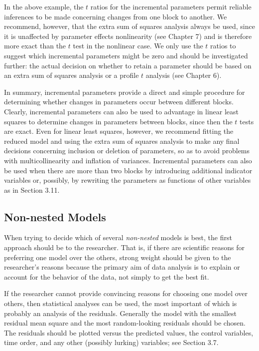 In the above example, the $t$ ratios for the
incremental parameters permit reliable
inferences to be made concerning changes from one block to
another.
We recommend, however, that the extra sum of squares analysis
always be used,
since it is unaffected by parameter effects
nonlinearity (see Chapter 7) and is therefore more exact than the $t$ test
in the nonlinear case.
We only use the $t$ ratios to suggest which incremental
parameters might be zero and should be investigated
further:
the actual decision on whether to retain a parameter should be based on an
extra sum of squares analysis or a profile $t$ analysis (see Chapter 6).

In summary, incremental parameters provide a direct and simple
procedure for determining whether changes in parameters occur
between different blocks.
Clearly, incremental parameters can also be used
to advantage in linear least squares to
determine changes in parameters between blocks, since then the
$t$ tests are exact.
Even for linear least squares, however, we recommend fitting the
reduced model and using the extra sum of squares analysis to
make any final decisions concerning inclusion or deletion of
parameters, so as to avoid problems with multicollinearity and inflation
of variances.
Incremental parameters can also be used when there are more than
two blocks by introducing additional indicator variables or,
possibly, by rewriting the parameters as functions of other
variables as in Section 3.11.

\subsection{Non-nested Models}

When trying to decide which of several {\em non-nested\/} models is
best, the first approach should be to the researcher.
That is, if there are scientific reasons for preferring one model
over the others, strong weight should be given to the
researcher's reasons because the primary aim of data analysis is
to explain or account for the behavior of the data, not simply to
get the best fit.

If the researcher cannot provide convincing reasons for choosing
one model over others, then statistical analyses can be used, the
most important of which is probably an analysis of the residuals.
Generally the model with the smallest residual mean square and
the most random-looking residuals should be chosen.
The residuals should be plotted versus the predicted values, the
control variables, time order, and any other (possibly lurking)
variables; see Section 3.7.

